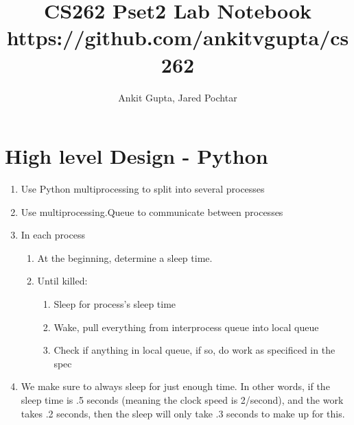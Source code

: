 \documentclass[journal]{IEEEtran}
\begin{document}
%
\title{CS262 Pset2 Lab Notebook \\ \large https://github.com/ankitvgupta/cs262}
%
%
%

\author{Ankit Gupta, Jared Pochtar}


\maketitle

\section{High level Design - Python}
\begin{enumerate}
  \item Use Python multiprocessing to split into several processes
  \item Use multiprocessing.Queue to communicate between processes
  \item In each process
  \begin{enumerate}
    \item At the beginning, determine a sleep time.
    \item Until killed:
    \begin{enumerate}
      \item Sleep for process’s sleep time
      \item Wake, pull everything from interprocess queue into local queue
      \item Check if anything in local queue, if so, do work as specificed in the spec
    \end{enumerate}
  \end{enumerate}
  \item We make sure to always sleep for just enough time. In other words, if the sleep time is .5 seconds (meaning the clock speed is 2/second), and the work takes .2 seconds, then the sleep will only take .3 seconds to make up for this.
\end{enumerate}
\end{document}
